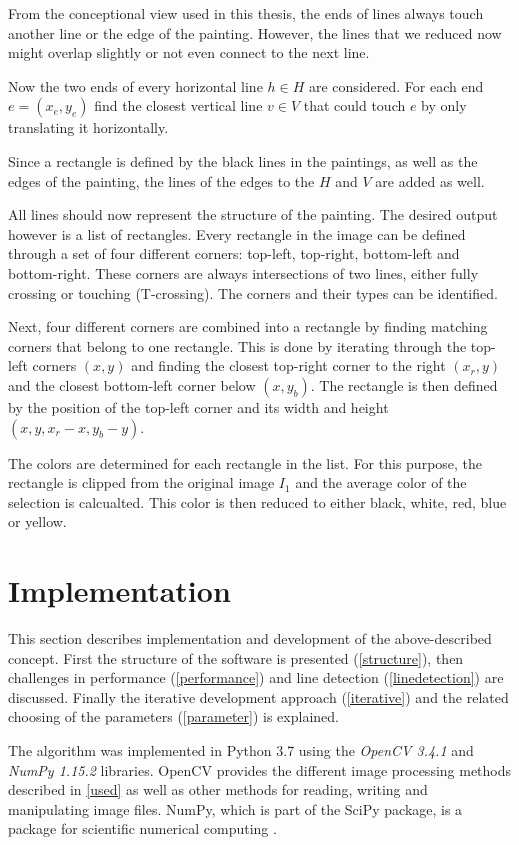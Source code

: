 \documentclass[serif,article,noparskip]{agse-thesis}
\begin{document}
From the conceptional view used in this thesis, the ends of lines always touch
another line or the edge of the painting. However, the lines that we reduced now
might overlap slightly or not even connect to the next line.

Now the two ends of every horizontal line $h \in H$ are considered. For each end
$e = (x_e,y_e)$ find the closest vertical line $v \in V$ that could touch $e$ by
only translating it horizontally.

Since a rectangle is defined by the black lines in the paintings, as well as the
edges of the painting, the lines of the edges to the $H$ and $V$ are added as
well.

All lines should now represent the structure of the painting. The desired output
however is a list of rectangles. Every rectangle in the image can be defined
through a set of four different corners: top-left, top-right, bottom-left and
bottom-right. These corners are always intersections of two lines, either fully
crossing or touching (T-crossing). The corners and their types can be
identified.

Next, four different corners are combined into a rectangle by finding matching
corners that belong to one rectangle. This is done by iterating through the
top-left corners $(x,y)$ and finding the closest top-right corner to the right
$(x_r, y)$ and the closest bottom-left corner below $(x, y_b)$. The rectangle is
then defined by the position of the top-left corner and its width and height
$(x,y,x_r-x,y_b-y)$.

The colors are determined for each rectangle in the list. For this purpose, the
rectangle is clipped from the original image $I_1$ and the average color of the
selection is calcualted. This color is then reduced to either black, white, red,
blue or yellow.

\section{Implementation} \label{implementation}

This section describes implementation and development of the above-described
concept. First the structure of the software is presented (\ref{structure}),
then challenges in performance (\ref{performance}) and line detection
(\ref{linedetection}) are discussed. Finally the iterative development approach
(\ref{iterative}) and the related choosing of the parameters (\ref{parameter})
is explained.

The algorithm was implemented in Python 3.7 using the \textit{OpenCV 3.4.1} and
\textit{NumPy 1.15.2} libraries. OpenCV provides the different image processing
methods described in \ref{used} as well as other methods for reading, writing
and manipulating image files. NumPy, which is part of the SciPy package, is a
package for scientific numerical computing \cite{scipy}.
\end{document}
